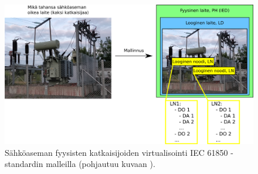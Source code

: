 \begin{figure}[ht!]
	\includegraphics[width=1\textwidth]{pictures/substation-abstraction.png}
	\caption{Sähköaseman fyysisten katkaisijoiden virtualisointi IEC 61850 -standardin malleilla (pohjautuu kuvaan \cite[s.~17]{IEC61850-7-1}).}
	\label{fig:substation-abstraction}
\end{figure}

